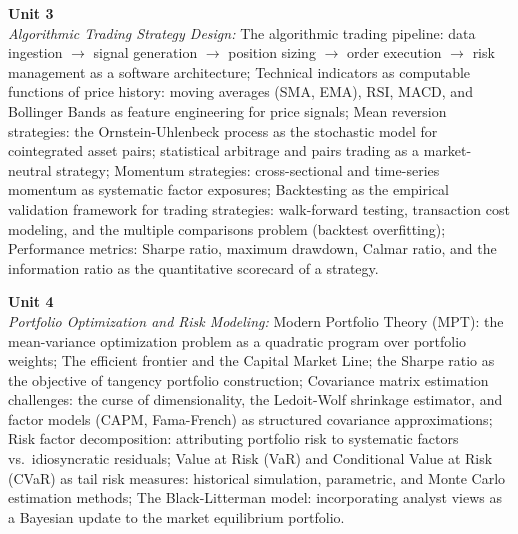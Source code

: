 \vspace{0.3cm}

\noindent\textbf{Unit 3} \\
\textit{Algorithmic Trading Strategy Design:} The algorithmic trading pipeline: data ingestion $\rightarrow$ signal generation $\rightarrow$ position sizing $\rightarrow$ order execution $\rightarrow$ risk management as a software architecture; Technical indicators as computable functions of price history: moving averages (SMA, EMA), RSI, MACD, and Bollinger Bands as feature engineering for price signals; Mean reversion strategies: the Ornstein-Uhlenbeck process as the stochastic model for cointegrated asset pairs; statistical arbitrage and pairs trading as a market-neutral strategy; Momentum strategies: cross-sectional and time-series momentum as systematic factor exposures; Backtesting as the empirical validation framework for trading strategies: walk-forward testing, transaction cost modeling, and the multiple comparisons problem (backtest overfitting); Performance metrics: Sharpe ratio, maximum drawdown, Calmar ratio, and the information ratio as the quantitative scorecard of a strategy.

\vspace{0.3cm}

\noindent\textbf{Unit 4} \\
\textit{Portfolio Optimization and Risk Modeling:} Modern Portfolio Theory (MPT): the mean-variance optimization problem as a quadratic program over portfolio weights; The efficient frontier and the Capital Market Line; the Sharpe ratio as the objective of tangency portfolio construction; Covariance matrix estimation challenges: the curse of dimensionality, the Ledoit-Wolf shrinkage estimator, and factor models (CAPM, Fama-French) as structured covariance approximations; Risk factor decomposition: attributing portfolio risk to systematic factors vs.\ idiosyncratic residuals; Value at Risk (VaR) and Conditional Value at Risk (CVaR) as tail risk measures: historical simulation, parametric, and Monte Carlo estimation methods; The Black-Litterman model: incorporating analyst views as a Bayesian update to the market equilibrium portfolio.

\vspace{0.3cm}

